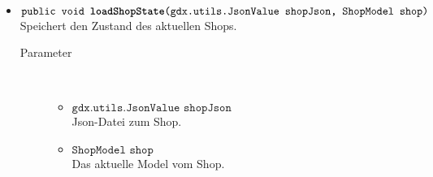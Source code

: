 \begin{description}
\begin{itemize}
		\item $\texttt{public void \textbf{loadShopState}(gdx.utils.JsonValue shopJson, ShopModel shop)}$ \\ Speichert den Zustand des aktuellen Shops.
		\begin{description}
			\item[Parameter] \hfill \\
			\vspace{-.8cm}
			\begin{itemize}
				\item $\texttt{gdx.utils.JsonValue shopJson}$ \\ Json-Datei zum Shop.
								\item $\texttt{ShopModel shop}$ \\ Das aktuelle Model vom Shop.
			\end{itemize}
		\end{description}
			\end{itemize}
\end{description}